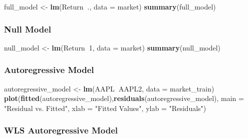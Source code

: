 \documentclass[]{article}
\newenvironment{Shaded}{\begin{snugshade}}{\end{snugshade}}
\newcommand{\KeywordTok}[1]{\textcolor[rgb]{0.13,0.29,0.53}{\textbf{#1}}}
\newcommand{\DataTypeTok}[1]{\textcolor[rgb]{0.13,0.29,0.53}{#1}}
\newcommand{\DecValTok}[1]{\textcolor[rgb]{0.00,0.00,0.81}{#1}}
\newcommand{\StringTok}[1]{\textcolor[rgb]{0.31,0.60,0.02}{#1}}
\newcommand{\OperatorTok}[1]{\textcolor[rgb]{0.81,0.36,0.00}{\textbf{#1}}}
\newcommand{\NormalTok}[1]{#1}
\begin{document}
\begin{Shaded}
\begin{Highlighting}[]
\NormalTok{full_model <-}\StringTok{ }\KeywordTok{lm}\NormalTok{(Return}\OperatorTok{~}\NormalTok{., }\DataTypeTok{data =}\NormalTok{ market)}
\KeywordTok{summary}\NormalTok{(full_model)}
\end{Highlighting}
\end{Shaded}

\subsubsection{Null Model}\label{null-model}

\begin{Shaded}
\begin{Highlighting}[]
\NormalTok{null_model <-}\StringTok{ }\KeywordTok{lm}\NormalTok{(Return}\OperatorTok{~}\DecValTok{1}\NormalTok{, }\DataTypeTok{data =}\NormalTok{ market)}
\KeywordTok{summary}\NormalTok{(null_model)}
\end{Highlighting}
\end{Shaded}

\subsubsection{Autoregressive Model}\label{autoregressive-model}

\begin{Shaded}
\begin{Highlighting}[]
\NormalTok{autoregressive_model <-}\StringTok{ }\KeywordTok{lm}\NormalTok{(AAPL}\OperatorTok{~}\NormalTok{AAPL2, }\DataTypeTok{data =}\NormalTok{ market_train)}
\KeywordTok{plot}\NormalTok{(}\KeywordTok{fitted}\NormalTok{(autoregressive_model),}\KeywordTok{residuals}\NormalTok{(autoregressive_model), }
     \DataTypeTok{main =} \StringTok{"Residual vs. Fitted"}\NormalTok{, }\DataTypeTok{xlab =} \StringTok{"Fitted Values"}\NormalTok{, }\DataTypeTok{ylab =} \StringTok{"Residuals"}\NormalTok{)}
\end{Highlighting}
\end{Shaded}

\subsubsection{WLS Autoregressive Model}\label{wls-autoregressive-model}
\end{document}
